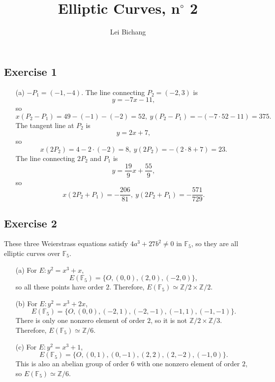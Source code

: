 \documentclass{article}
\title{Elliptic Curves, n$^\circ$ 2}
\author{Lei Bichang}
\theoremstyle{definition}
\theoremstyle{remark}
\newcommand{\Z}{\mathbb{Z}}
\newcommand{\F}{\mathbb{F}}
\begin{document}
\maketitle


\subsection*{Exercise 1}
\begin{enumerate}
    \item [(a)] $-P_1 =  (-1, -4)$.
    The line connecting $P_2 = (-2, 3)$ is \[y = -7x - 11,\]
    so \[x(P_2-P_1) = 49 - (-1) - (-2) = 52,\ y(P_2-P_1) = -(-7\cdot 52-11) = 375.\]
    The tangent line at $P_2$ is \[y = 2x + 7,\]
    so \[x(2P_2) = 4-2\cdot (-2) = 8,\ y(2P_2) = -(2\cdot 8 + 7) = 23.\]
    The line connecting $2P_2$ and $P_1$ is \[y = \frac{19}{9}x + \frac{55}{9},\]
    so \[x(2P_2+P_1) = -\frac{206}{81},\ y(2P_2+P_1) = -\frac{571}{729}.\]

\end{enumerate}

\subsection*{Exercise 2}
These three Weierstrass equations satisfy $4a^3+27b^2\ne 0$ in $\F_5$, so they are all elliptic curves over $\F_5$.
\begin{enumerate}
    \item [(a)] For $E : y^2 = x^3+x$, \[E(\F_5) = \{O, (0, 0), (2, 0), (-2, 0)\},\]
    so all these points have order $2$. Therefore, $E(\F_5)\simeq \Z/2\times\Z/2$.
    \item [(b)] For $E:y^2 = x^3+2x$, \[E(\F_5) = \{O, (0, 0), (-2, 1), (-2, -1), (-1, 1), (-1, -1)\}.\]
    There is only one nonzero element of order $2$, so it is not $\Z/2\times\Z/3$. Therefore, $E(\F_5)\simeq \Z/6$.
    \item [(c)] For $E:y^2 = x^3+1$, \[E(\F_5) = \{O, (0, 1), (0, -1), (2, 2), (2, -2), (-1, 0)\}.\]
    This is also an abelian group of order $6$ with one nonzero element of order $2$, so $E(\F_5)\simeq \Z/6$.
\end{enumerate}
\end{document}
